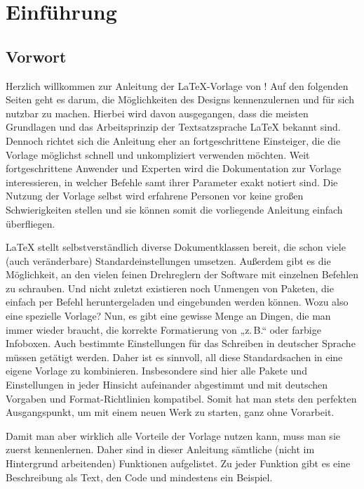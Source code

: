 	\chapter{Einführung}
	
		\section{Vorwort}
		
			Herzlich willkommen zur Anleitung der \LaTeX{}-Vorlage von ! Auf den folgenden Seiten geht es darum, die Möglichkeiten des Designs kennenzulernen und für sich nutzbar zu machen. Hierbei wird davon ausgegangen, dass die meisten Grundlagen und das Arbeitsprinzip der Textsatzsprache \LaTeX{} bekannt sind. Dennoch richtet sich die Anleitung eher an fortgeschrittene Einsteiger, die die Vorlage möglichst schnell und unkompliziert verwenden möchten. Weit fortgeschrittene Anwender und Experten wird die Dokumentation zur Vorlage interessieren, in welcher Befehle samt ihrer Parameter exakt notiert sind. Die Nutzung der Vorlage selbst wird erfahrene Personen vor keine großen Schwierigkeiten stellen und sie können somit die vorliegende Anleitung einfach überfliegen. 
			
			\LaTeX{} stellt selbstverständlich diverse Dokumentklassen bereit, die schon viele (auch veränderbare) Standardeinstellungen umsetzen. Außerdem gibt es die Möglichkeit, an den vielen feinen Drehreglern der Software mit einzelnen Befehlen zu schrauben. Und nicht zuletzt existieren noch Unmengen von Paketen, die einfach per Befehl heruntergeladen und eingebunden werden können. Wozu also eine spezielle Vorlage? Nun, es gibt eine gewisse Menge an Dingen, die man immer wieder braucht, \zb die korrekte Formatierung von „z.\,B.“ oder farbige Infoboxen. Auch bestimmte Einstellungen für das Schreiben in deutscher Sprache müssen getätigt werden. Daher ist es sinnvoll, all diese Standardsachen in eine eigene Vorlage zu kombinieren. Insbesondere sind hier alle Pakete und Einstellungen in jeder Hinsicht aufeinander abgestimmt und mit deutschen Vorgaben und Format-Richtlinien kompatibel. Somit hat man stets den perfekten Ausgangspunkt, um mit einem neuen Werk zu starten, ganz ohne Vorarbeit. 
			
			Damit man aber wirklich alle Vorteile der Vorlage nutzen kann, muss man sie zuerst kennenlernen. Daher sind in dieser Anleitung sämtliche (nicht im Hintergrund arbeitenden) Funktionen aufgelistet. Zu jeder Funktion gibt es eine Beschreibung als Text, den Code und mindestens ein Beispiel. 
			

